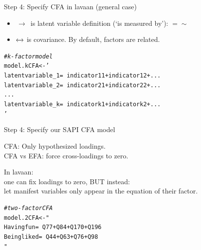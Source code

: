\documentclass[10pt]{beamer}\usepackage[]{graphicx}\usepackage[]{xcolor}
\makeatletter
\newcommand{\hlstr}[1]{\textcolor[rgb]{0.192,0.494,0.8}{#1}}%
\newcommand{\hlcom}[1]{\textcolor[rgb]{0.678,0.584,0.686}{\textit{#1}}}%
\newcommand{\hlstd}[1]{\textcolor[rgb]{0.345,0.345,0.345}{#1}}%
\newcommand{\hlkwb}[1]{\textcolor[rgb]{0.69,0.353,0.396}{#1}}%
\newenvironment{kframe}{%
 \def\at@end@of@kframe{}%
 \ifinner\ifhmode%
  \def\at@end@of@kframe{\end{minipage}}%
  \begin{minipage}{\columnwidth}%
 \fi\fi%
 \def\FrameCommand##1{\hskip\@totalleftmargin \hskip-\fboxsep
 \colorbox{shadecolor}{##1}\hskip-\fboxsep
     \hskip-\linewidth \hskip-\@totalleftmargin \hskip\columnwidth}%
 \MakeFramed {\advance\hsize-\width
   \@totalleftmargin\z@ \linewidth\hsize
   \@setminipage}}%
 {\par\unskip\endMakeFramed%
 \at@end@of@kframe}
\newenvironment{knitrout}{}{} %
\makeatother
\begin{document}
\begin{frame}[fragile]{Step 4: Specify CFA in lavaan (general case)}

\begin{itemize}
  \item $\,\to\,$ is latent variable definition (`is measured by'): $=\sim$ 
  \item $\xleftrightarrow{}$ is covariance. By default, factors are related. %
\end{itemize}

\begin{knitrout}
\color{fgcolor}\begin{kframe}
\begin{alltt}
\hlcom{# k-factor model}
\hlstd{model.kCFA} \hlkwb{<-} \hlstr{'
latent variable_1 =~ indicator11 + indicator12 + ...
latent variable_2 =~ indicator21 + indicator22 + ...
...
latent variable_k =~ indicatork1 + indicatork2 + ...
'}
\end{alltt}
\end{kframe}
\end{knitrout}

\end{frame}
%
\begin{frame}[fragile]{Step 4: Specify our SAPI CFA model}

CFA: Only hypothesized loadings.\\
CFA vs EFA: force cross-loadings to zero.

\vspace{5mm}

In lavaan: \\
one can fix loadings to zero, BUT instead:\\
let manifest variables only appear in the equation of their factor.

\vspace{5mm}

\begin{knitrout}
\color{fgcolor}\begin{kframe}
\begin{alltt}
\hlcom{# two-factor CFA}
\hlstd{model.2CFA} \hlkwb{<-} \hlstr{"
 Having fun  =~ Q77 + Q84 + Q170 + Q196 
 Being liked =~ Q44 + Q63 + Q76  + Q98
"}
\end{alltt}
\end{kframe}
\end{knitrout}

\end{frame}
\end{document}
